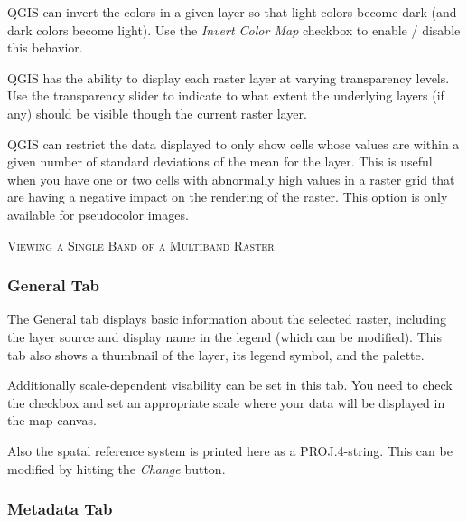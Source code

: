 \smallskip

QGIS can invert the colors in a given layer so that light colors become dark
(and dark colors become light). Use the \textsl{Invert Color Map} checkbox to
enable / disable this behavior.

QGIS has the ability to display each raster layer at varying transparency
levels. Use the transparency slider to indicate to
what extent the underlying layers (if any) should be visible though the
current raster layer. 

QGIS can restrict the data displayed to only show cells whose values are
within a given number of standard deviations of the mean for the
layer. This is useful when you have one or
two cells with abnormally high values in a raster grid that are having a
negative impact on the rendering of the raster. This option is only available
for pseudocolor images.

\begin{Tip}\caption{\textsc{Viewing a Single Band of a Multiband Raster}}
\end{Tip} 

\subsubsection{General Tab}\label{label_generaltab}

The General tab displays basic information about the selected raster,
including the layer source and  display name in the legend (which can be
modified). This tab also shows a thumbnail of the layer, its legend symbol,
and the palette.

Additionally scale-dependent visability can be set in this tab. You need to
check the checkbox and set an appropriate scale where your data will be
displayed in the map canvas.

Also the spatal reference system is printed here as a PROJ.4-string. 
This can be modified by hitting the \textsl{Change} button.

\subsubsection{Metadata Tab}\label{label_metatab}

